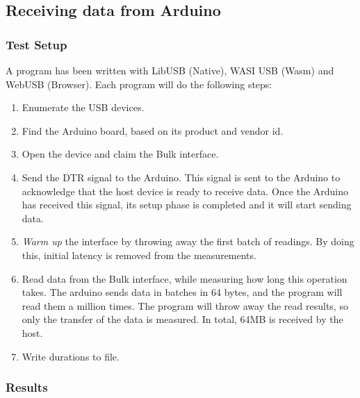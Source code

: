 \subsection{Receiving data from Arduino}

\subsubsection{Test Setup}
A program has been written with LibUSB (Native), WASI USB (Wasm) and WebUSB (Browser). Each program will do the following steps:

\begin{enumerate}
\item Enumerate the USB devices.
\item Find the Arduino board, based on its product and vendor id.
\item Open the device and claim the Bulk interface.
\item Send the \acrfull{DTR} signal to the Arduino. This signal is sent to the Arduino to acknowledge that the host device is ready to receive data. Once the Arduino has received this signal, its setup phase is completed and it will start sending data.
\item \textit{Warm up } the interface by throwing away the first batch of readings. By doing this, initial latency is removed from the measurements.
\item Read data from the Bulk interface, while measuring how long this operation takes. The arduino sends data in batches in 64 bytes, and the program will read them a million times. The program will throw away the read results, so only the transfer of the data is measured. In total, 64MB is received by the host.
\item Write durations to file.
\end{enumerate}

\subsubsection{Results}

